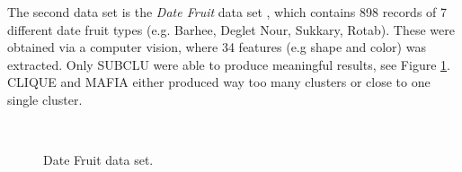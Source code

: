 The second data set is the \textit{Date Fruit} data set \cite{date-fruit}, which contains 898 records of 7 different date fruit types (e.g. Barhee, Deglet Nour, Sukkary, Rotab). These were obtained via a computer vision, where 34 features (e.g shape and color) was extracted. Only SUBCLU were able to produce meaningful results, see Figure \ref{fig:real_world_date_fruit}. CLIQUE and MAFIA either produced way too many clusters or close to one single cluster.
\begin{figure}[H]
    \vspace*{-0.5cm}
    \centering
    ~~~~
    \caption{Date Fruit data set.}
    \label{fig:real_world_date_fruit}
\end{figure}